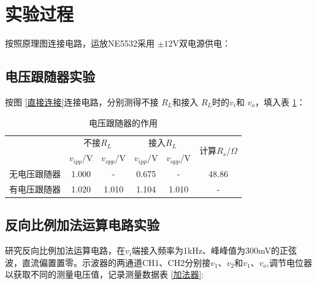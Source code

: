 \documentclass[a4paper]{article}
\theoremstyle{definition}
\theoremstyle{plain}
\theoremstyle{remark}
\newcommand{\reffig}[1]{图 \ref{#1}}
\newcommand{\reftab}[1]{表 \ref{#1}}
\begin{document}
\section{实验过程}
按照原理图连接电路，运放NE5532采用 $\pm \mathrm{12V}$双电源供电：

\subsection{电压跟随器实验}
按\reffig{直接连接}连接电路，分别测得不接 $R_L$和接入 $R_L$时的$v_i$和 $v_o$，填入\reftab{电压跟随器的作用}：

\begin{table}[H]
	\center
	\large
	\begin{tabular}{|c|cc|cc|c|}
		\hline
		\multirow{2}{*}{} & \multicolumn{2}{c|}{不接$R_L$}     & \multicolumn{2}{c|}{接入$R_L$} & \multirow{2}{*}{计算$R_s$/$\Omega$}                       \\ \cline{2-5}
		                  & \multicolumn{1}{c|}{$v_{ipp}$/V} & $v_{opp}$/V                  & \multicolumn{1}{c|}{$v_{ipp}$/V}  & $v_{opp}$/V &       \\ \hline
		无电压跟随器            & \multicolumn{1}{c|}{1.000}       & -                            & \multicolumn{1}{c|}{0.675}        & -           & 48.86 \\ \hline
		有电压跟随器            & \multicolumn{1}{c|}{1.020}       & 1.010                        & \multicolumn{1}{c|}{1.104}        & 1.010       & -     \\ \hline
	\end{tabular}
	\caption{电压跟随器的作用}
	\label{电压跟随器的作用}
\end{table}

\subsection{反向比例加法运算电路实验}
研究反向比例加法运算电路，在$v_i$端接入频率为1kHz、峰峰值为300mV的正弦波，直流偏置置零。示波器的两通道CH1、CH2分别接$v_1$、$v_2$和$v_1$、$v_o$,调节电位器以获取不同的测量电压值，记录测量数据\reftab{加法器}:
\end{document}
